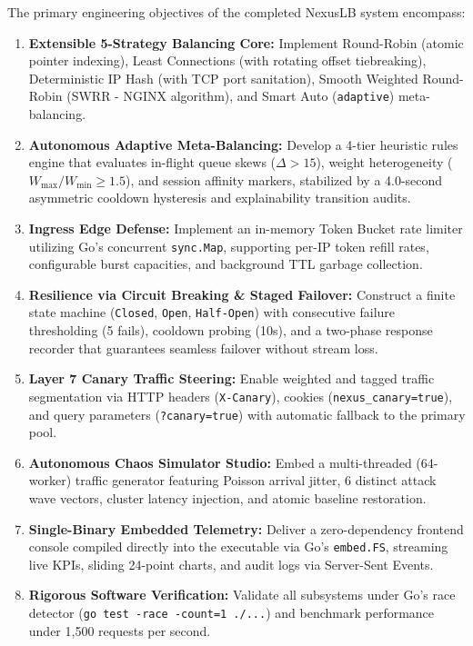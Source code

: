 \documentclass[12pt,openany]{report}
\begin{document}
The primary engineering objectives of the completed NexusLB system encompass:
\begin{enumerate}
  \item \textbf{Extensible 5-Strategy Balancing Core:} Implement Round-Robin (atomic pointer indexing), Least Connections (with rotating offset tiebreaking), Deterministic IP Hash (with TCP port sanitation), Smooth Weighted Round-Robin (SWRR - NGINX algorithm), and Smart Auto (\texttt{adaptive}) meta-balancing.
  \item \textbf{Autonomous Adaptive Meta-Balancing:} Develop a 4-tier heuristic rules engine that evaluates in-flight queue skews ($\Delta > 15$), weight heterogeneity ($W_{\max}/W_{\min} \ge 1.5$), and session affinity markers, stabilized by a 4.0-second asymmetric cooldown hysteresis and explainability transition audits.
  \item \textbf{Ingress Edge Defense:} Implement an in-memory Token Bucket rate limiter utilizing Go's concurrent \texttt{sync.Map}, supporting per-IP token refill rates, configurable burst capacities, and background TTL garbage collection.
  \item \textbf{Resilience via Circuit Breaking \& Staged Failover:} Construct a finite state machine (\texttt{Closed}, \texttt{Open}, \texttt{Half-Open}) with consecutive failure thresholding (5 fails), cooldown probing (10s), and a two-phase response recorder that guarantees seamless failover without stream loss.
  \item \textbf{Layer 7 Canary Traffic Steering:} Enable weighted and tagged traffic segmentation via HTTP headers (\texttt{X-Canary}), cookies (\texttt{nexus\_canary=true}), and query parameters (\texttt{?canary=true}) with automatic fallback to the primary pool.
  \item \textbf{Autonomous Chaos Simulator Studio:} Embed a multi-threaded (64-worker) traffic generator featuring Poisson arrival jitter, 6 distinct attack wave vectors, cluster latency injection, and atomic baseline restoration.
  \item \textbf{Single-Binary Embedded Telemetry:} Deliver a zero-dependency frontend console compiled directly into the executable via Go's \texttt{embed.FS}, streaming live KPIs, sliding 24-point charts, and audit logs via Server-Sent Events.
  \item \textbf{Rigorous Software Verification:} Validate all subsystems under Go's race detector (\texttt{go test -race -count=1 ./...}) and benchmark performance under 1,500 requests per second.
\end{enumerate}
\end{document}
